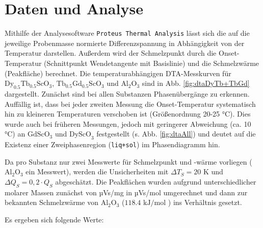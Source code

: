 \documentclass[aps,twocolumn,secnumarabic,nobalancelastpage,amsmath,amssymb,
nofootinbib,superscriptaddress]{revtex4-1}
\begin{document}

\section{Daten und Analyse}
\noindent Mithilfe der Analysesoftware \texttt{Proteus Thermal Analysis} lässt sich die auf die jeweilige Probenmasse normierte Differenzspannung in
Abhängigkeit von der Temperatur darstellen. Außerdem wird der Schmelzpunkt durch die Onset-Temperatur (Schnittpunkt Wendetangente mit Basislinie) \cite{versuchsbeschr} und die Schmelzwärme (Peakfläche)
berechnet. Die temperaturabhängigen DTA-Messkurven für $\text{Dy}_{0.5}\text{Tb}_{0.5}\text{ScO}_3$, $\text{Tb}_{0.5}\text{Gd}_{0.5}\text{ScO}_3$ und $\text{Al}_{2}\text{O}_3$ sind in Abb. \ref{fig:dtaDyTb+TbGd} dargestellt.
\newline\newline Zunächst sind bei allen Substanzen Phasenübergänge zu erkennen. Auffällig ist, dass bei jeder zweiten Messung die Onset-Temperatur systematisch hin zu kleineren Temperaturen verschoben ist (Größenordnung 20-25 °C).
Dies wurde auch bei früheren Messungen, jedoch mit geringerer Abweichung (ca. 10 °C) an $\text{GdScO}_3$ und $\text{DyScO}_3$ festgestellt (s. Abb. \ref{fig:dtaAll}) und deutet auf die Existenz einer Zweiphasenregion (\texttt{liq+sol}) im Phasendiagramm hin.

Da pro Substanz nur zwei Messwerte für Schmelzpunkt und -wärme vorliegen ($\text{Al}_2\text{O}_3$ ein Messwert), werden die Unsicherheiten mit $\Delta T_S=20\text{ K}$ und $\Delta Q_S=0,2\cdot Q_S$ abgeschätzt.
Die Peakflächen wurden aufgrund unterschiedlicher molarer Massen zunächst von µVs/mg in µVs/mol umgerechnet und dann zur bekannten Schmelzwärme von $\text{Al}_2\text{O}_3$ ($118.4\text{ kJ/mol}$ \cite{schmelzwAl2O3}) ins Verhältnis gesetzt.

Es ergeben sich folgende Werte:
\end{document}
